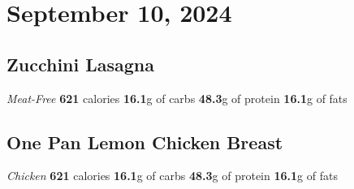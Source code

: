 \documentclass{article}%
\begin{document}
\section*{September 10, 2024}%
\label{sec:September10,2024}%
\begin{paracol}[2]{2}%
\sloppy%
\subsection*{Zucchini Lasagna}%
\label{subsec:ZucchiniLasagna}%
\textit{Meat{-}Free}%
\newline%
\newline%
\textbf{621} calories%
\newline%
\textbf{16.1}g of carbs%
\newline%
\textbf{48.3}g of protein%
\newline%
\textbf{16.1}g of fats%
\newline%
\switchcolumn

%
\subsection*{One Pan Lemon Chicken Breast}%
\label{subsec:OnePanLemonChickenBreast}%
\textit{Chicken}%
\newline%
\newline%
\textbf{621} calories%
\newline%
\textbf{16.1}g of carbs%
\newline%
\textbf{48.3}g of protein%
\newline%
\textbf{16.1}g of fats%
\newline%
\switchcolumn

%
\end{paracol}

%
\end{document}
